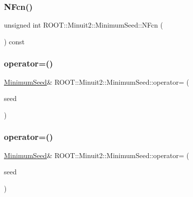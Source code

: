 \subsubsection{\texorpdfstring{NFcn()}{NFcn()}\hspace{0.1cm}{\footnotesize\ttfamily [2/2]}}
{\footnotesize\ttfamily unsigned int R\+O\+O\+T\+::\+Minuit2\+::\+Minimum\+Seed\+::\+N\+Fcn (\begin{DoxyParamCaption}{ }\end{DoxyParamCaption}) const\hspace{0.3cm}{\ttfamily [inline]}}

\mbox{\label{classROOT_1_1Minuit2_1_1MinimumSeed_a0ec0790834635093f5b3cffa976efe60}} 
\subsubsection{\texorpdfstring{operator=()}{operator=()}\hspace{0.1cm}{\footnotesize\ttfamily [1/2]}}
{\footnotesize\ttfamily \mbox{\hyperlink{classROOT_1_1Minuit2_1_1MinimumSeed}{Minimum\+Seed}}\& R\+O\+O\+T\+::\+Minuit2\+::\+Minimum\+Seed\+::operator= (\begin{DoxyParamCaption}\item[{const \mbox{\hyperlink{classROOT_1_1Minuit2_1_1MinimumSeed}{Minimum\+Seed}} \&}]{seed }\end{DoxyParamCaption})\hspace{0.3cm}{\ttfamily [inline]}}

\mbox{\label{classROOT_1_1Minuit2_1_1MinimumSeed_a0ec0790834635093f5b3cffa976efe60}} 
\subsubsection{\texorpdfstring{operator=()}{operator=()}\hspace{0.1cm}{\footnotesize\ttfamily [2/2]}}
{\footnotesize\ttfamily \mbox{\hyperlink{classROOT_1_1Minuit2_1_1MinimumSeed}{Minimum\+Seed}}\& R\+O\+O\+T\+::\+Minuit2\+::\+Minimum\+Seed\+::operator= (\begin{DoxyParamCaption}\item[{const \mbox{\hyperlink{classROOT_1_1Minuit2_1_1MinimumSeed}{Minimum\+Seed}} \&}]{seed }\end{DoxyParamCaption})\hspace{0.3cm}{\ttfamily [inline]}}

